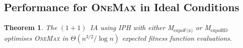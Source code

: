 \documentclass[lettersize,journal]{IEEEtran}
\newcommand{\oneoneIA}{$(1+1)$~IA}
\newcommand{\expoF}{M$_{\text{expoF(x)}}$}
\newcommand{\expoHD}{M$_{\text{expoHD}}$}
\newtheorem{theorem}{Theorem}
\begin{document}
\subsection{Performance for \textsc{OneMax} in Ideal Conditions}




\setcounter{theorem}{1}
\begin{theorem}
The {\oneoneIA } using IPH with either {\expoF } or {\expoHD } optimises \textsc{OneMax} in $\Theta(n^{3/2}/\log n)$ expected fitness function evaluations.
\end{theorem}
\end{document}
